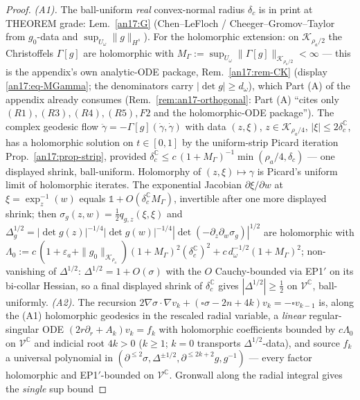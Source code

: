 \begin{proof}
\emph{(A1).} The ball-uniform \emph{real} convex-normal radius
$\delta_c$ is in print at THEOREM grade: Lem.~\ref{an17:G}
(Chen--LeFloch / Cheeger--Gromov--Taylor from $g_0$-data and
$\sup_{U_\omega}\|g\|_{H^s}$). For the holomorphic extension: on
$\mathcal K_{\rho_a/2}$ the Christoffels $\Gamma[g]$ are holomorphic
with $M_\Gamma:=\sup_{U_\omega}\|\Gamma[g]\|_{\mathcal K_{\rho_a/2}}
<\infty$ --- this is the appendix's own analytic-ODE package,
Rem.~\ref{an17:rem-CK} (display \eqref{an17:eq-MGamma}; the
denominators carry $|\det g|\ge d_\omega$), which Part (A)
of the appendix already consumes (Rem.~\ref{rem:an17-orthogonal}: Part (A)
``cites only $(R1),(R3),(R4),(R5),F2$ and the holomorphic-ODE
package''). The complex geodesic flow $\ddot\gamma=-\Gamma[g](\dot
\gamma,\dot\gamma)$ with data $(z,\xi)$, $z\in\mathcal K_{\rho_a/4}$,
$|\xi|\le2\delta_c^{\mathbb C}$, has a holomorphic solution on
$t\in[0,1]$ by the uniform-strip Picard iteration Prop.~\ref{an17:prop-strip}, provided
$\delta_c^{\mathbb C}\le c\,(1+M_\Gamma)^{-1}\min(\rho_a/4,\delta_c)$
--- one displayed shrink, ball-uniform. Holomorphy of
$(z,\xi)\mapsto\gamma$ is Picard's uniform limit of holomorphic
iterates. The exponential Jacobian $\partial\xi/\partial w$ at
$\xi=\exp_z^{-1}(w)$ equals $\mathbb 1+O(\delta_c^{\mathbb C}
M_\Gamma)$, invertible after one more displayed shrink; then
$\sigma_g(z,w)=\tfrac12 q_{g,z}(\xi,\xi)$ and
$\Delta^{1/2}_g=|\det g(z)|^{-1/4}|\det g(w)|^{-1/4}
|\det(-\partial_z\partial_w\sigma_g)|^{1/2}$ are holomorphic with
$\Lambda_0:=c\,(1+\varepsilon_a+\|g_0\|_{\mathcal K_{\rho_a}})
(1+M_\Gamma)^2(\delta_c^{\mathbb C})^2+c\,d_\omega^{-1/2}
(1+M_\Gamma)^{2}$; non-vanishing of $\Delta^{1/2}$:
$\Delta^{1/2}=1+O(\sigma)$ with the $O$ Cauchy-bounded via EP1$'$ on
its bi-collar Hessian, so a final displayed shrink of
$\delta_c^{\mathbb C}$ gives $|\Delta^{1/2}|\ge\tfrac12$ on
$\mathcal V^{\mathbb C}$, ball-uniformly.
\emph{(A2).} The recursion $2\nabla\sigma\!\cdot\!\nabla v_k+
(\square\sigma-2n+4k)v_k=-\square v_{k-1}$ is, along the (A1)
holomorphic geodesics in the rescaled radial variable, a
\emph{linear} regular-singular ODE $(2r\partial_r+A_k)v_k=f_k$ with
holomorphic coefficients bounded by $c\Lambda_0$ on
$\mathcal V^{\mathbb C}$ and indicial root $4k>0$ ($k\ge1$; $k=0$
transports $\Delta^{1/2}$-data), and source $f_k$ a universal
polynomial in $(\partial^{\le2}\sigma,\Delta^{\pm1/2},
\partial^{\le2k+2}g,g^{-1})$ --- every factor holomorphic and
EP1$'$-bounded on $\mathcal V^{\mathbb C}$. Gronwall along the radial
integral gives the \emph{single} sup bound

\end{proof}
